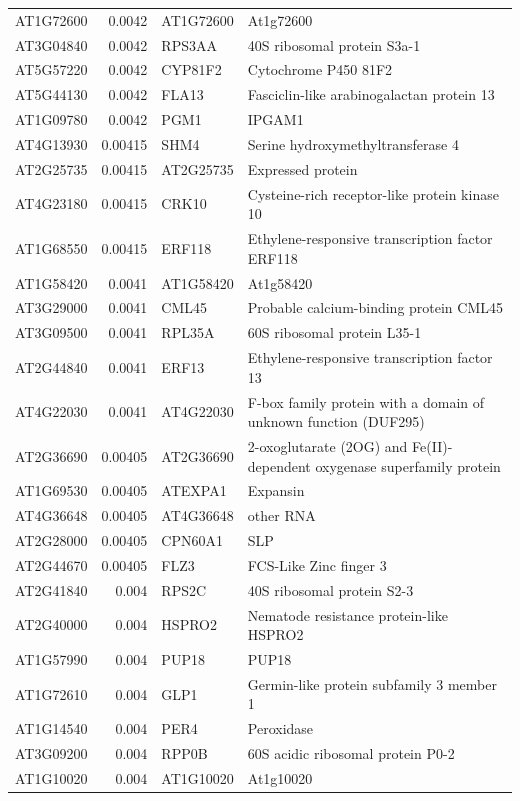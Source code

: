 \documentclass[11pt]{article}
\begin{document}
\begin{center}
\begin{tabular}{lrll}
AT1G72600 & 0.0042 & AT1G72600 & At1g72600\\
AT3G04840 & 0.0042 & RPS3AA & 40S ribosomal protein S3a-1\\
AT5G57220 & 0.0042 & CYP81F2 & Cytochrome P450 81F2\\
AT5G44130 & 0.0042 & FLA13 & Fasciclin-like arabinogalactan protein 13\\
AT1G09780 & 0.0042 & PGM1 & IPGAM1\\
AT4G13930 & 0.00415 & SHM4 & Serine hydroxymethyltransferase 4\\
AT2G25735 & 0.00415 & AT2G25735 & Expressed protein\\
AT4G23180 & 0.00415 & CRK10 & Cysteine-rich receptor-like protein kinase 10\\
AT1G68550 & 0.00415 & ERF118 & Ethylene-responsive transcription factor ERF118\\
AT1G58420 & 0.0041 & AT1G58420 & At1g58420\\
AT3G29000 & 0.0041 & CML45 & Probable calcium-binding protein CML45\\
AT3G09500 & 0.0041 & RPL35A & 60S ribosomal protein L35-1\\
AT2G44840 & 0.0041 & ERF13 & Ethylene-responsive transcription factor 13\\
AT4G22030 & 0.0041 & AT4G22030 & F-box family protein with a domain of unknown function (DUF295)\\
AT2G36690 & 0.00405 & AT2G36690 & 2-oxoglutarate (2OG) and Fe(II)-dependent oxygenase superfamily protein\\
AT1G69530 & 0.00405 & ATEXPA1 & Expansin\\
AT4G36648 & 0.00405 & AT4G36648 & other RNA\\
AT2G28000 & 0.00405 & CPN60A1 & SLP\\
AT2G44670 & 0.00405 & FLZ3 & FCS-Like Zinc finger 3\\
AT2G41840 & 0.004 & RPS2C & 40S ribosomal protein S2-3\\
AT2G40000 & 0.004 & HSPRO2 & Nematode resistance protein-like HSPRO2\\
AT1G57990 & 0.004 & PUP18 & PUP18\\
AT1G72610 & 0.004 & GLP1 & Germin-like protein subfamily 3 member 1\\
AT1G14540 & 0.004 & PER4 & Peroxidase\\
AT3G09200 & 0.004 & RPP0B & 60S acidic ribosomal protein P0-2\\
AT1G10020 & 0.004 & AT1G10020 & At1g10020\\

\end{tabular}
\end{center}
\end{document}

